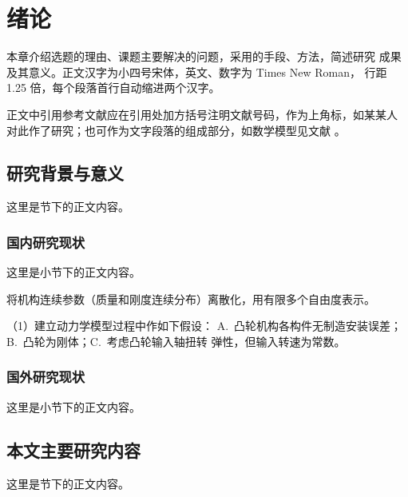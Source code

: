 \chapter{绪论}

本章介绍选题的理由、课题主要解决的问题，采用的手段、方法，简述研究
成果及其意义。正文汉字为小四号宋体，英文、数字为 Times New Roman，
行距 1.25 倍，每个段落首行自动缩进两个汉字。

正文中引用参考文献应在引用处加方括号注明文献号码，作为上角标，如某某人
对此作了研究\cite{ref1}；也可作为文字段落的组成部分，如数学模型见文献
\cite{ref2}。

\section{研究背景与意义}

这里是节下的正文内容。

\subsection{国内研究现状}

这里是小节下的正文内容。


将机构连续参数（质量和刚度连续分布）离散化，用有限多个自由度表示。

（1）\quad 建立动力学模型过程中作如下假设：
A.~凸轮机构各构件无制造安装误差；B.~凸轮为刚体；C.~考虑凸轮输入轴扭转
弹性，但输入转速为常数。

\subsection{国外研究现状}

这里是小节下的正文内容。

\section{本文主要研究内容}

这里是节下的正文内容。
